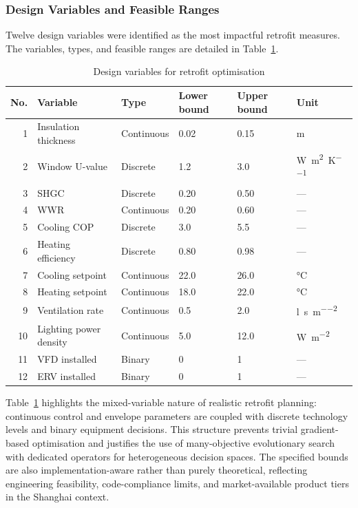 \documentclass[11pt]{article}
\providecommand{\W}{\watt}
\providecommand{\K}{\kelvin}
\providecommand{\L}{\litre}
\providecommand{\m}{\metre}
\providecommand{\s}{\second}
\begin{document}
\subsubsection{Design Variables and Feasible Ranges}

Twelve design variables were identified as the most impactful retrofit measures. The variables, types, and feasible ranges are detailed in Table~\ref{tab:design_vars}.

\begin{table}[!htbp]
\centering
\caption{Design variables for retrofit optimisation}
\label{tab:design_vars}
\begin{tabular}{rlllll}
\toprule
No. & Variable & Type & Lower bound & Upper bound & Unit \\
\midrule
1 & Insulation thickness & Continuous & 0.02 & 0.15 & m \\
2 & Window U-value & Discrete & 1.2 & 3.0 & \si{\W\per\square\m\per\K} \\
3 & SHGC & Discrete & 0.20 & 0.50 & — \\
4 & WWR & Continuous & 0.20 & 0.60 & — \\
5 & Cooling COP & Discrete & 3.0 & 5.5 & — \\
6 & Heating efficiency & Discrete & 0.80 & 0.98 & — \\
7 & Cooling setpoint & Continuous & 22.0 & 26.0 & \si{\celsius} \\
8 & Heating setpoint & Continuous & 18.0 & 22.0 & \si{\celsius} \\
9 & Ventilation rate & Continuous & 0.5 & 2.0 & \si{\L\per\s\per\square\m} \\
10 & Lighting power density & Continuous & 5.0 & 12.0 & \si{\W\per\square\m} \\
11 & VFD installed & Binary & 0 & 1 & — \\
12 & ERV installed & Binary & 0 & 1 & — \\
\bottomrule
\end{tabular}
\end{table}

Table~\ref{tab:design_vars} highlights the mixed-variable nature of realistic retrofit planning: continuous control and envelope parameters are coupled with discrete technology levels and binary equipment decisions. This structure prevents trivial gradient-based optimisation and justifies the use of many-objective evolutionary search with dedicated operators for heterogeneous decision spaces. The specified bounds are also implementation-aware rather than purely theoretical, reflecting engineering feasibility, code-compliance limits, and market-available product tiers in the Shanghai context.
\end{document}
